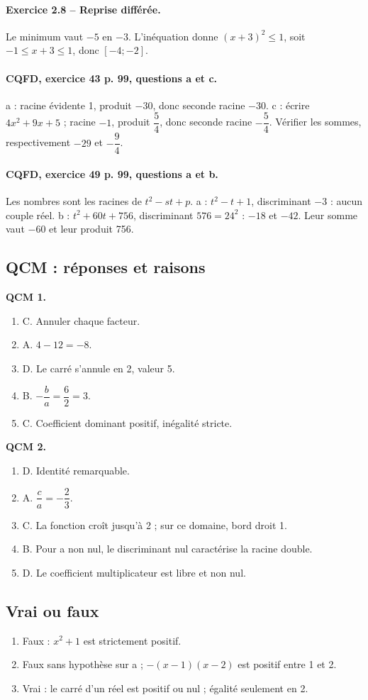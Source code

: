 \paragraph{Exercice 2.8 -- Reprise différée.} Le minimum vaut $-5$ en $-3$. L’inéquation donne $(x+3)^2\leq1$, soit $-1\leq x+3\leq1$, donc $[-4;-2]$.
\paragraph{CQFD, exercice 43 p. 99, questions a et c.} a : racine évidente 1, produit $-30$, donc seconde racine $-30$. c : écrire $4x^2+9x+5$ ; racine $-1$, produit $\dfrac54$, donc seconde racine $-\dfrac54$. Vérifier les sommes, respectivement $-29$ et $-\dfrac94$.
\paragraph{CQFD, exercice 49 p. 99, questions a et b.} Les nombres sont les racines de $t^2-st+p$. a : $t^2-t+1$, discriminant $-3$ : aucun couple réel. b : $t^2+60t+756$, discriminant $576=24^2$ : $-18$ et $-42$. Leur somme vaut $-60$ et leur produit 756.
\subsection*{QCM : réponses et raisons}
\textbf{QCM 1.}
\begin{enumerate}
\item C. Annuler chaque facteur.
\item A. $4-12=-8$.
\item D. Le carré s’annule en 2, valeur 5.
\item B. $-\dfrac{b}{a}=\dfrac{6}{2}=3$.
\item C. Coefficient dominant positif, inégalité stricte.
\end{enumerate}
\textbf{QCM 2.}
\begin{enumerate}
\item D. Identité remarquable.
\item A. $\dfrac{c}{a}=-\dfrac{2}{3}$.
\item C. La fonction croît jusqu’à 2 ; sur ce domaine, bord droit 1.
\item B. Pour a non nul, le discriminant nul caractérise la racine double.
\item D. Le coefficient multiplicateur est libre et non nul.
\end{enumerate}
\subsection*{Vrai ou faux}
\begin{enumerate}
\item Faux : $x^2+1$ est strictement positif.
\item Faux sans hypothèse sur a ; $-(x-1)(x-2)$ est positif entre 1 et 2.
\item Vrai : le carré d’un réel est positif ou nul ; égalité seulement en 2.
\end{enumerate}

